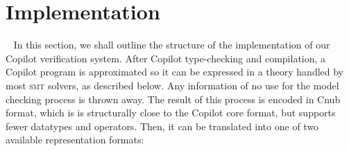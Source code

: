 \section{Implementation}~\label{sec:structure} 
%
%
In this section, we shall outline the structure of the implementation
of our Copilot verification system.   %
After Copilot type-checking and compilation, a Copilot program is approximated
so it can be expressed in a theory handled by most \textsc{smt} solvers, as described below. Any information
of no use for the model checking process is thrown away. The result of this
process is encoded in Cnub format, which is is structurally close to the
Copilot core format, but supports fewer datatypes and operators. Then, it can be
translated into one of two available representation formats:


